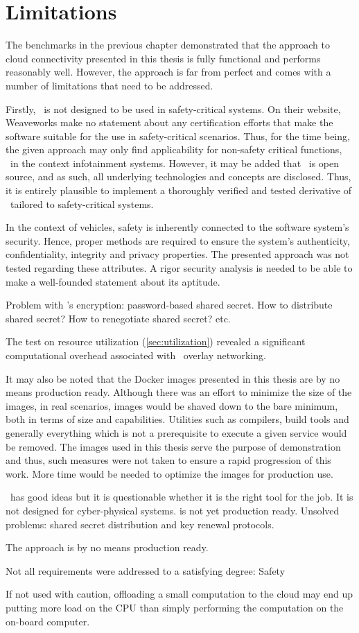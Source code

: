 %
%
%
%
%
%
%
%
%
%
\section{Limitations}
The benchmarks in the previous chapter demonstrated that the approach to cloud connectivity presented in this thesis is fully functional and performs reasonably well. However, the approach is far from perfect and comes with a number of limitations that need to be addressed.

Firstly, \wnet\ is not designed to be used in safety-critical systems. On their website, Weaveworks make no statement about any certification efforts that make the software suitable for the use in safety-critical scenarios. Thus, for the time being, the given approach may only find applicability for non-safety critical functions, \eg\ in the context infotainment systems. However, it may be added that \wnet\ is open source, and as such, all underlying technologies and concepts are disclosed. Thus, it is entirely plausible to implement a thoroughly verified and tested derivative of \wnet\ tailored to safety-critical systems.

In the context of vehicles, safety is inherently connected to the software system's security. Hence, proper methods are required to ensure the system's authenticity, confidentiality, integrity and privacy properties. The presented approach was not tested regarding these attributes. A rigor security analysis is needed to be able to make a well-founded statement about its aptitude.

Problem with \wnet 's encryption: password-based shared secret. How to distribute shared secret? How to renegotiate shared secret? etc.

The test on resource utilization (\cf \autoref{sec:utilization}) revealed a significant computational overhead associated with \wnet\ overlay networking. 

It may also be noted that the Docker images presented in this thesis are by no means production ready. Although there was an effort to minimize the size of the images, in real scenarios, images would be shaved down to the bare minimum, both in terms of size and capabilities. Utilities such as compilers, build tools and generally everything which is not a prerequisite to execute a given service would be removed. The images used in this thesis serve the purpose of demonstration and thus, such measures were not taken to ensure a rapid progression of this work. More time would be needed to optimize the images for production use.



\weave\ has good ideas but it is questionable whether it is the right tool for the job. It is not designed for cyber-physical systems. is not yet production ready. Unsolved problems: shared secret distribution and key renewal protocols.


The approach is by no means production ready.


Not all requirements were addressed to a satisfying degree: Safety

If not used with caution, offloading a small computation to the cloud may end up putting more load on the CPU than simply performing the computation on the on-board computer.

